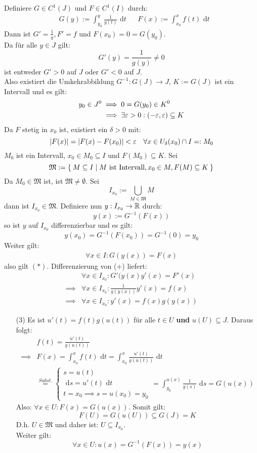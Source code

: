 \documentclass[a4paper,oneside,DIV15,BCOR12mm,chapterprefix=true,headings=onelinechapter]{scrbook}
\begin{document}
\begin{beweis}
Definiere $G\in C^1(J)$ und $F\in C^1(I)$ durch:
\begin{align*}
&G(y):=\int_{y_0}^y \frac 1{g(t)}\text{ d}t &&F(x):=\int_{x_0}^x f(t)\text{ d}t
\end{align*}
Dann ist $G'=\frac 1g, F'=f$ und $F(x_0)=0=G(y_0)$.\\
Da für alle $y\in J$ gilt:
\[G'(y)=\frac 1{g(y)}\ne 0\] 
ist entweder $G'>0$ auf $J$ oder $G'<0$ auf $J$.\\
Also existiert die Umkehrabbildung $G^{-1}:G(J)\to J$, $K:=G(J)$ ist ein Intervall und es gilt:
\begin{align*}
y_0\in J^0&\implies 0=G(y_0)\in K^0\\
&\implies \exists \varepsilon>0:(-\varepsilon,\varepsilon)\subseteq K
\end{align*}
Da $F$ stetig in $x_0$ ist, existiert ein $\delta>0$ mit: 
\[|F(x)|=|F(x)-F(x_0)|<\varepsilon \quad \forall x\in U_\delta(x_0)\cap I=:M_0\]
$M_0$ ist ein Intervall, $x_0\in M_0\subseteq I$ und $F(M_0)\subseteq K$. Sei
\[\mathfrak{M}:=\Set{M\subseteq I | M \text{ ist Intervall},x_0\in M,F(M)\subseteq K}\] 
Da $M_0\in\mathfrak{M}$ ist, ist $\mathfrak{M}\ne\emptyset$. Sei
\[I_{x_0}:=\bigcup_{M\in\mathfrak{M}} M\]
dann ist $I_{x_0}\in\mathfrak{M}$. Definiere nun $y:I_{x_0}\to\mathbb{R}$ durch:
\[y(x):=G^{-1}(F(x))\]
so ist $y$ auf $I_{x_0}$ differenzierbar und es gilt: 
\[y(x_0)=G^{-1}(F(x_0))=G^{-1}(0)=y_0\]
Weiter gilt:
\begin{align*}\forall x\in I: G(y(x))=F(x)\tag{+}\end{align*}
also gilt $(*)$.
Differenzierung von (+) liefert:
\begin{align*}
&\forall x\in I_{x_0}: G'(y(x)y'(x)=F'(x)\\
\implies &\forall x\in I_{x_0}: \frac 1{g(y(x))}y'(x)=f(x)\\
\implies &\forall x\in I_{x_0}: y'(x)=f(x)g(y(x))
\end{align*}
\begin{itemize}
\item[(3)] Es ist $u'(t)=f(t)g(u(t))$ für alle $t\in U$ \textbf{und} $u(U)\subseteq J$.
Daraus folgt:
\begin{align*}
&f(t)=\frac{u'(t)}{g(u(t))}\\
\implies &F(x)=\int_{x_0}^x f(t)\text{ d}t=\int_{x_0}^x \frac{u'(t)}{g(u(t))}\text{ d}t\\
&\stackrel{Subst.}{=}
\begin{cases}
s=u(t)\\
\text{ d}s= u'(t)\text{ d}t\\
t=x_0\implies s=u(x_0)=y_0
\end{cases}=\int_{y_0}^{u(x)}\frac 1{g(s)}\text{ d}s=G(u(x))
\end{align*}
Also: $\forall x\in U:F(x)=G(u(x))$. Somit gilt:
\[F(U)=G(u(U))\subseteq G(J)=K\]
D.h. $U\in\mathfrak{M}$ und daher ist: $U\subseteq I_{x_0}$.\\
Weiter gilt:
\[\forall x\in U: u(x)=G^{-1}(F(x))=y(x)\]
\end{itemize}
\end{beweis}
\end{document}
